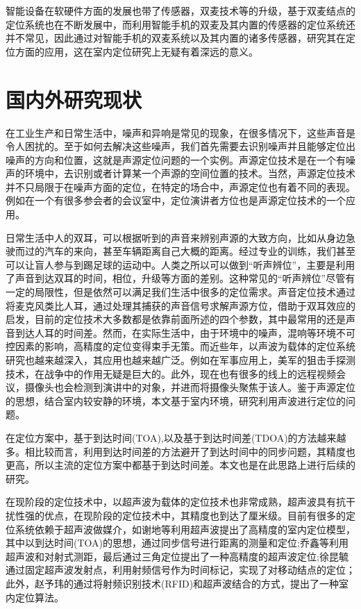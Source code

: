 \documentclass[winfonts,oneside]{njuthesis}
\begin{document}
		智能设备在软硬件方面的发展也带了传感器，双麦技术等的升级，基于双麦结点的定位系统也在不断发展中，而利用智能手机的双麦及其内置的传感器的定位系统还并不常见，因此通过对智能手机的双麦系统以及其内置的诸多传感器，研究其在定位方面的应用，这在室内定位研究上无疑有着深远的意义。
				
	\section{国内外研究现状}
	
		在工业生产和日常生活中，噪声和异响是常见的现象，在很多情况下，这些声音是令人困扰的。至于如何去解决这些噪声，我们首先需要去识别噪声并且能够定位出噪声的方向和位置，这就是声源定位问题的一个实例。声源定位技术是在一个有噪声的环境中，去识别或者计算某一个声源的空间位置的技术。当然，声源定位技术并不只局限于在噪声方面的定位，在特定的场合中，声源定位也有着不同的表现。例如在一个有很多参会者的会议室中，定位演讲者方位也是声源定位技术的一个应用。
		
		日常生活中人的双耳，可以根据听到的声音来辨别声源的大致方向，比如从身边急驶而过的汽车的来向，甚至车辆距离自己大概的距离。经过专业的训练，我们甚至可以让盲人参与到踢足球的运动中。人类之所以可以做到“听声辨位”，主要是利用了声音到达双耳的时间，相位，升级等方面的差别。这种常见的“听声辨位”尽管有一定的局限性，但是依然可以满足我们生活中很多的定位需求。声音定位技术通过将麦克风类比人耳，通过处理其捕获的声音信号求解声源方位，借助于双耳效应的启发，目前的定位技术大多数都是依靠前面所述的四个参数，其中最常用的还是声音到达人耳的时间差。然而，在实际生活中，由于环境中的噪声，混响等环境不可控因素的影响，高精度的定位变得束手无策。而近些年，以声波为载体的定位系统研究也越来越深入，其应用也越来越广泛。例如在军事应用上，美军的狙击手探测技术\cite{Sniper}，在战争中的作用无疑是巨大的。此外，现在也有很多的线上的远程视频会议，摄像头也会检测到演讲中的对象，并进而将摄像头聚焦于该人。鉴于声源定位的思想，结合室内较安静的环境，本文基于室内环境，研究利用声波进行定位的问题。
		
		在定位方案中，基于到达时间(TOA),以及基于到达时间差(TDOA)的方法越来越多。相比较而言，利用到达时间差的方法避开了到达时间中的同步问题，其精度也更高，所以主流的定位方案中都基于到达时间差。本文也是在此思路上进行后续的研究。
		
		在现阶段的定位技术中，以超声波为载体的定位技术也非常成熟，超声波具有抗干扰性强的优点，在现阶段的定位技术中，其精度也到达了厘米级。目前有很多的定位系统依赖于超声波做媒介，如谢地等利用超声波提出了高精度的室内定位模型，其中以到达时间(TOA)的思想，通过同步信号进行距离的测量和定位\cite{xiedi};乔鑫等利用超声波和对射式测距，最后通过三角定位提出了一种高精度的超声波定位\cite{qiaoxin};徐昆毓通过固定超声波发射点，利用射频信号作为时间标记，实现了对移动结点的定位\cite{xukunyu}；此外，赵予玮的通过将射频识别技术(RFID)和超声波结合的方式，提出了一种室内定位算法\cite{zhaoyuwei}。
		
\end{document}
